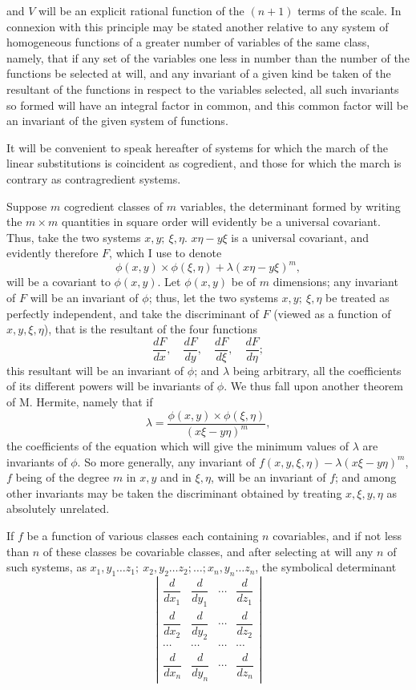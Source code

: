 \documentclass[11pt]{article}
\newcommand{\sourcepage}[1]{\marginpar{\scriptsize p.~#1}}
\begin{document}
{{\sourcepage{290}
and $V$ will be an explicit rational function of the $(n+1)$ terms of the scale. In connexion with this principle may be stated another relative to any system of homogeneous functions of a greater number of variables of the same class, namely, that if any set of the variables one less in number than the number of the functions be selected at will, and any invariant of a given kind be taken of the resultant of the functions in respect to the variables selected, all such invariants so formed will have an integral factor in common, and this common factor will be an invariant of the given system of functions.

It will be convenient to speak hereafter of systems for which the march of the linear substitutions is coincident as cogredient, and those for which the march is contrary as contragredient systems.

Suppose $m$ cogredient classes of $m$ variables, the determinant formed by writing the $m\times m$ quantities in square order will evidently be a universal covariant. Thus, take the two systems $x,y;\ \xi,\eta$. $x\eta-y\xi$ is a universal covariant, and evidently therefore $F$, which I use to denote
\[
\phi(x,y)\times\phi(\xi,\eta)+\lambda(x\eta-y\xi)^m,
\]
will be a covariant to $\phi(x,y)$. Let $\phi(x,y)$ be of $m$ dimensions; any invariant of $F$ will be an invariant of $\phi$; thus, let the two systems $x,y;\ \xi,\eta$ be treated as perfectly independent, and take the discriminant of $F$ (viewed as a function of $x,y,\xi,\eta$), that is the resultant of the four functions
\[
\frac{dF}{dx},\quad \frac{dF}{dy},\quad \frac{dF}{d\xi},\quad \frac{dF}{d\eta};
\]
this resultant will be an invariant of $\phi$; and $\lambda$ being arbitrary, all the coefficients of its different powers will be invariants of $\phi$. We thus fall upon another theorem of M. Hermite, namely that if
\[
\lambda=\frac{\phi(x,y)\times\phi(\xi,\eta)}{(x\xi-y\eta)^m},
\]
the coefficients of the equation which will give the minimum values of $\lambda$ are invariants of $\phi$. So more generally, any invariant of $f(x,y,\xi,\eta)-\lambda(x\xi-y\eta)^m$, $f$ being of the degree $m$ in $x,y$ and in $\xi,\eta$, will be an invariant of $f$; and among other invariants may be taken the discriminant obtained by treating $x,\xi,y,\eta$ as absolutely unrelated.

If $f$ be a function of various classes each containing $n$ covariables, and if not less than $n$ of these classes be covariable classes, and after selecting at will any $n$ of such systems, as $x_1,y_1\ldots z_1;\ x_2,y_2\ldots z_2;\ldots; x_n,y_n\ldots z_n$, the symbolical determinant
\[
\left|\begin{array}{cccc}
\dfrac{d}{dx_1}&\dfrac{d}{dy_1}&\cdots&\dfrac{d}{dz_1}\\
\dfrac{d}{dx_2}&\dfrac{d}{dy_2}&\cdots&\dfrac{d}{dz_2}\\
\cdots&\cdots&\cdots&\cdots\\
\dfrac{d}{dx_n}&\dfrac{d}{dy_n}&\cdots&\dfrac{d}{dz_n}
\end{array}\right|
\]

}}
\end{document}
